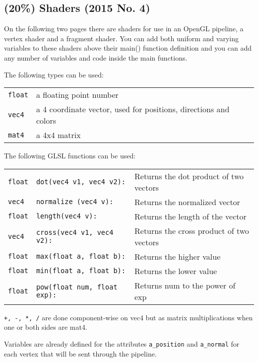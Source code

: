 \subsection{(20\%) Shaders (2015 No. 4)}

On the following two pages there are shaders for use in an OpenGL pipeline, a vertex shader and a fragment shader.  You can add both uniform and varying variables to these shaders above their main() function definition and you can add any number of variables and code inside the main functions. 
 
The following types can be used: 

\begin{tabular}{ll}
    \texttt{float} & a floating point number  \\
    \texttt{vec4}  & a 4 coordinate vector, used for positions, directions and colors  \\
    \texttt{mat4}  & a 4x4 matrix  \\
\end{tabular}
 
The following GLSL functions can be used: 

\begin{tabular}{lll}
    \texttt{float} & \texttt{dot(vec4 v1, vec4 v2):}     & Returns the dot product of two vectors       \\
    \texttt{vec4}  & \texttt{normalize (vec4 v):}        & Returns the normalized vector                \\
    \texttt{float} & \texttt{length(vec4 v):}            & Returns the length of the vector             \\
    \texttt{vec4}  & \texttt{cross(vec4 v1, vec4 v2):}   & Returns the cross product of two vectors     \\
    \texttt{float} & \texttt{max(float a, float b):}     & Returns the higher value                     \\
    \texttt{float} & \texttt{min(float a, float b):}     & Returns the lower value                      \\
    \texttt{float} & \texttt{pow(float num, float exp):} & Returns num to the power of exp              \\
\end{tabular}
 
\verb|+, -, *, /| are done component-wise on vec4 but as matrix multiplications when one or both sides are mat4. 
 
Variables are already defined for the attributes \texttt{a\_position} and \texttt{a\_normal} for each vertex that will be sent through the pipeline. 
 
